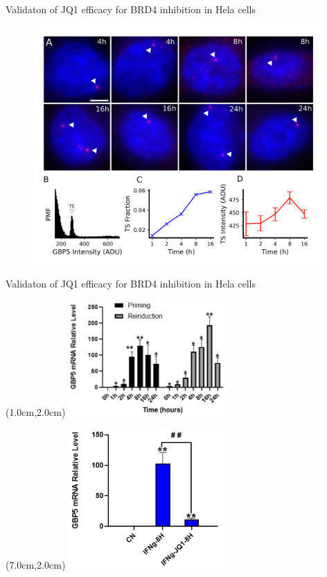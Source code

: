 \documentclass{beamer}					%
\begin{document}
\begin{frame}{Validaton of JQ1 efficacy for BRD4 inhibition in Hela cells}
\begin{figure}
\includegraphics[width=11cm]{Figure-2.png}
\end{figure}
\end{frame}


\begin{frame}{Validaton of JQ1 efficacy for BRD4 inhibition in Hela cells}
\begin{textblock*}{6cm}(1.0cm,2.0cm)
\includegraphics[width=6cm]{GBP5-RT-qPCR-crop.png}
\end{textblock*}
\begin{textblock*}{6cm}(7.0cm,2.0cm)
\includegraphics[width=6cm]{GBP5-JQ1-KD-crop.png}
\end{textblock*}
\end{frame}
\end{document}

